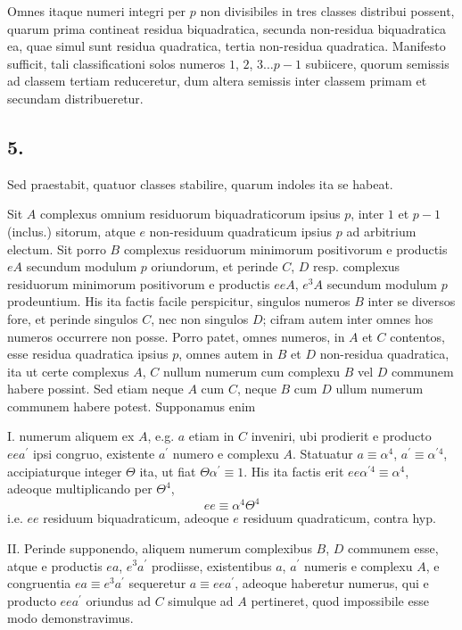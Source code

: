 \documentclass[twoside,12pt]{memoir}
\begin{document}
Omnes itaque numeri integri per \(p\) non divisibiles in tres classes distribui possent, quarum prima contineat residua biquadratica, secunda non-residua biquadratica ea, quae simul sunt residua quadratica, tertia non-residua quadratica. Manifesto sufficit, tali classificationi solos numeros \(1\), \(2\), \(3 \ldots p-1\) subiicere, quorum semissis ad classem tertiam reduceretur, dum altera semissis inter classem primam et secundam distribueretur.

\subsection*{5.}
 
Sed praestabit, quatuor classes stabilire, quarum indoles ita se habeat.
 
Sit \(A\) complexus omnium residuorum biquadraticorum ipsius \(p\), inter \(1\) et \(p-1\) (inclus.) sitorum, atque \(e\) non-residuum quadraticum ipsius \(p\) ad arbitrium electum. Sit porro \(B\) complexus residuorum minimorum positivorum e productis \(e A\) secundum modulum \(p\) oriundorum, et perinde \(C\), \(D\) resp. complexus residuorum minimorum positivorum e productis \(e e A\), \(e^{3} A\) secundum modulum \(p\) prodeuntium. His ita factis facile perspicitur, singulos numeros \(B\) inter se diversos fore, et perinde singulos \(C\), nec non singulos \(D\); cifram autem inter omnes hos numeros occurrere non posse. Porro patet, omnes numeros, in \(A\) et \(C\) contentos, esse residua quadratica ipsius \(p\), omnes autem in \(B\) et \(D\) non-residua quadratica, ita ut certe complexus \(A\), \(C\) nullum numerum cum complexu \(B\) vel \(D\) communem habere possint. Sed etiam neque \(A\) cum \(C\), neque \(B\) cum \(D\) ullum numerum communem habere potest. Supponamus enim
 
I. numerum aliquem ex \(A\), e.g. \(a\) etiam in \(C\) inveniri, ubi prodierit e producto \(e e a^{\prime}\) ipsi congruo, existente \(a^{\prime}\) numero e complexu \(A\). Statuatur \(a \equiv \alpha^{4}\), \(a^{\prime} \equiv \alpha^{\prime 4}\), accipiaturque integer \(\Theta\) ita, ut fiat \(\Theta \alpha^{\prime} \equiv 1\). His ita factis erit \(e e \alpha^{\prime 4} \equiv \alpha^{4}\), adeoque multiplicando per \(\Theta^{4}\),
\[e e \equiv \alpha^{4} \Theta^{4}\]
i.e. \(ee\) residuum biquadraticum, adeoque \(e\) residuum quadraticum, contra hyp.\pagebreak%
 
II. Perinde supponendo, aliquem numerum complexibus \(B\), \(D\) communem esse, atque e productis \(e a\), \(e^{3} a^{\prime}\) prodiisse, existentibus \(a\), \(a^{\prime}\) numeris e complexu \(A\), e congruentia \(e a \equiv e^{3} a^{\prime}\) sequeretur \(a \equiv e e a^{\prime}\), adeoque haberetur numerus, qui e producto \(e e a^{\prime}\) oriundus ad \(C\) simulque ad \(A\) pertineret, quod impossibile esse modo demonstravimus.
\end{document}
